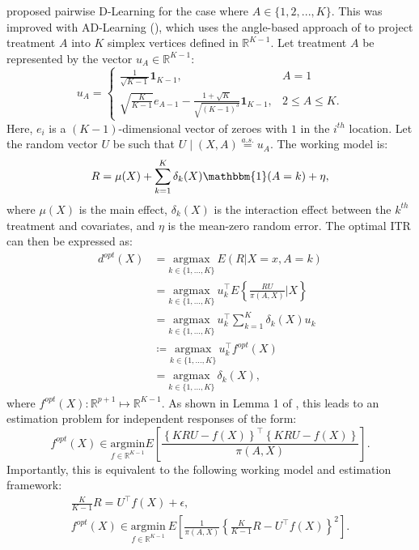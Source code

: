 \documentclass[useAMS,usenatbib]{biom}
\begin{document}
\cite{qi_d-learning_2018} proposed pairwise D-Learning for the case where $A \in \{ 1, 2, ..., K \}$. This was improved with AD-Learning (\cite{qi_multi-armed_2020}), which uses the angle-based approach of \cite{zhang_multicategory_2014} to project treatment $A$ into $K$ simplex vertices defined in $\mathbb{R}^{K-1}$. Let treatment $A$ be represented by the vector $u_A \in \mathbb{R}^{K-1}$:
\begin{equation} \label{angle_based_vectors}
u_A = \left\{
  \begin{array}{lr} 
      \frac{1}{\sqrt{K-1}} \mathbf{1}_{K-1}, & A=1 \\
      \sqrt{ \frac{K}{K-1}} e_{A-1} - \frac{1+\sqrt{K}}{\sqrt{(K-1)^3}} \mathbf{1}_{K-1}, & 2 \leq A \leq K.
  \end{array}
\right.
\end{equation}
Here, $e_{i}$ is a $(K-1)$-dimensional vector of zeroes with $1$ in the $i^{th}$ location. Let the random vector $U$ be such that $U \mid (X, A) \overset{a.s.}{=} u_A$. The working model is:
\begin{equation*}
    R = \mu(X) + \sum_{k=1}^K \delta_k(X)\mathbbm{1}(A=k) + \eta,
\end{equation*}
where $\mu(X)$ is the main effect, $\delta_k(X)$ is the interaction effect between the $k^{th}$ treatment and covariates, and $\eta$ is the mean-zero random error. The optimal ITR can then be expressed as:
\begin{equation} \label{ad_learning_itr}
\begin{split}
    d^{opt}(X) &= \underset{k \in \{1,...,K\}}{\mathrm{argmax}}\ E(R | X=x, A = k) \\
    &= \underset{k \in \{ 1,...,K\}}{\mathrm{argmax}}\ u_k^{\top} E \left\{ \frac{RU}{\pi(A, X)}  \bigg| X \right\} \\
    &= \underset{k \in \{ 1,...,K\}}{\mathrm{argmax}}\ u_k^{\top} \sum_{k=1}^K \delta_k(X)u_k \\
    &\coloneqq \underset{k \in \{ 1,...,K\}}{\mathrm{argmax}}\ u_k^{\top} f^{opt}(X) \\
    &= \underset{k \in \{1,...,K\}}{\mathrm{argmax}}\ \delta_k(X),
\end{split}
\end{equation}
where $f^{opt}(X) \colon \mathbb{R}^{p+1} \mapsto \mathbb{R}^{K-1}$. As shown in Lemma 1 of \cite{qi_multi-armed_2020}, this leads to an estimation problem for independent responses of the form:
\begin{equation*}
f^{opt}(X) \in \underset{f \in \mathbb{R}^{K-1}}{\mathrm{argmin}} E \left[ \frac{\left\{KRU-f(X)\right\}^{\top} \left\{KRU-f(X)\right\}}{\pi(A,X)} \right].
\end{equation*}
Importantly, this is equivalent to the following working model and estimation framework:
\begin{gather}
\frac{K}{K-1}R = U^{\top}f(X) + \epsilon, \label{multi_working_model} \\ 
f^{opt}(X) \in \underset{f \in \mathbb{R}^{K-1}}{\mathrm{argmin}}\ E \left[ \frac{1}{\pi(A,X)} \left\{ \frac{K}{K-1}R - U^{\top}f(X) \right\}^2 \right]. \nonumber
\end{gather}
\end{document}
